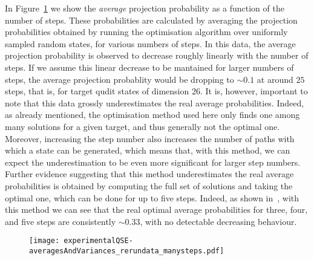 In Figure~\ref{fig:avgProbabilitiesVsStepNumber} we show the \textit{average} projection probability as a function of the number of steps. These probabilities are calculated by averaging the projection probabilities obtained by running the optimisation algorithm over uniformly sampled random states, for various numbers of steps. In this data, the average projection probability is observed to decrease roughly linearly with the number of steps. If we assume this linear decrease to be mantained for larger numbers of steps, the average projection probablity would be dropping to $\sim 0.1$ at around $25$ steps, that is, for target qudit states of dimension $26$.
It is, however, important to note that this data grossly underestimates the real average probabilities. Indeed, as already mentioned, the optimisation method used here only finds one among many solutions for a given target, and thus generally not the optimal one. Moreover, increasing the step number also increases the number of paths with which a state can be generated, which means that, with this method, we can expect the underestimation to be even more significant for larger step numbers.
Further evidence suggesting that this method underestimates the real average probabilities is obtained by computing the full set of solutions and taking the optimal one, which can be done for up to five steps. Indeed, as shown in~\cite{Innocenti2017}, with this method we can see that the real optimal average probabilities for three, four, and five steps are consistently $\sim 0.33$, with no detectable decreasing behaviour.
\begin{figure}[ht!]
    \centering
    \texttt{[image: experimentalQSE-averagesAndVariances\_rerundata\_manysteps.pdf]}
    \caption{}
    \label{fig:avgProbabilitiesVsStepNumber}
\end{figure}




\vspace{1em}
